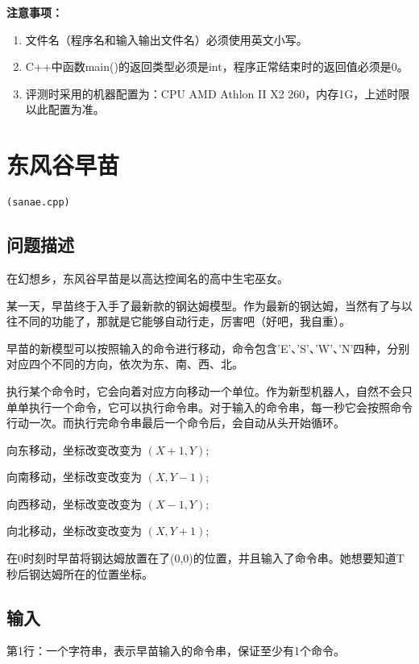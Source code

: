 \documentclass[UTF8]{ctexart}
\begin{document}
\textbf{注意事项：}
\begin{enumerate}
    \item{文件名（程序名和输入输出文件名）必须使用英文小写。}
    \item{C++中函数main()的返回类型必须是int，程序正常结束时的返回值必须是0。}
    \item{评测时采用的机器配置为：CPU AMD Athlon II X2 260，内存1G，上述时限以此配置为准。}
\end{enumerate}

\newpage
\setcounter{page}{1}
\pagestyle{plain}

\newpage
\section{东风谷早苗}
\begin{center}
\tt\large{(sanae.cpp)}
\end{center}
\subsection{问题描述}

在幻想乡，东风谷早苗是以高达控闻名的高中生宅巫女。   

某一天，早苗终于入手了最新款的钢达姆模型。作为最新的钢达姆，当然有了与以往不同的功能了，那就是它能够自动行走，厉害吧（好吧，我自重）。  

早苗的新模型可以按照输入的命令进行移动，命令包含’E’、’S’、’W’、’N’四种，分别对应四个不同的方向，依次为东、南、西、北。  

执行某个命令时，它会向着对应方向移动一个单位。作为新型机器人，自然不会只单单执行一个命令，它可以执行命令串。对于输入的命令串，每一秒它会按照命令行动一次。而执行完命令串最后一个命令后，会自动从头开始循环。  

向东移动，坐标改变改变为 $(X+1,Y)$;  

向南移动，坐标改变改变为 $(X,Y-1)$;  

向西移动，坐标改变改变为 $(X-1,Y)$;   

向北移动，坐标改变改变为 $(X,Y+1)$;  

在0时刻时早苗将钢达姆放置在了(0,0)的位置，并且输入了命令串。她想要知道T秒后钢达姆所在的位置坐标。

\subsection{输入}

第1行：一个字符串，表示早苗输入的命令串，保证至少有1个命令。  
\end{document}
